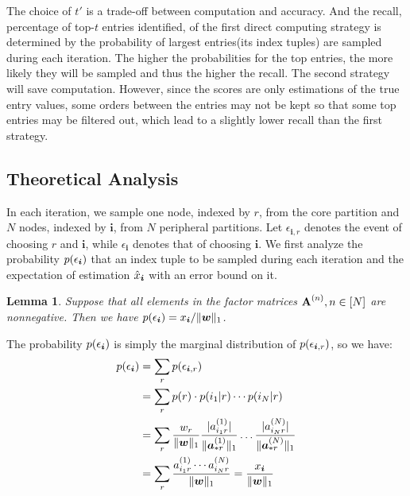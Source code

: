 \documentclass[10pt,journal,compsoc]{IEEEtran}
\newcommand{\Sca}[3]{{#1}^{(#2)}_{i_#2#3}}%
\newcommand{\anr}[2]{\Sca{a}{#1}{#2}}
\newcommand{\V}[1]{{\boldsymbol{{\MakeLowercase{#1}}}}}
\newcommand{\ColVec}[3]{\V{#1}^{(#2)}_{#3}}
\newcommand{\NormColA}[2]{\norm{\ColVec{a}{#1}{*#2}}{1}}
\newcommand{\predx}{\hat{x}_{\V{i}}}
\newcommand{\M}[1]{{\textbf{{\MakeUppercase{#1}}}}}
\newcommand{\norm}[2]{\|#1\|_{#2}}
\newtheorem{lemma}{Lemma}
\begin{document}
The choice of $t'$ is a trade-off between computation and accuracy. And the recall, percentage of top-$t$ entries identified, of the first direct computing strategy is determined by the probability of largest entries(its index tuples) are sampled during each iteration. The higher the probabilities for the top entries, the more likely they will be sampled and thus the higher the recall. The second strategy will save computation. However, since the scores are only estimations of the true entry values, some orders between the entries may not be kept so that some top entries may be filtered out, which lead to a slightly lower recall than the first strategy.


\subsection{Theoretical Analysis}
In each iteration, we sample one node, indexed by $r$, from the core partition and $N$ nodes, indexed by $\boldsymbol{i}$, from $N$ peripheral partitions. Let $\epsilon_{\boldsymbol{i},r}$ denotes the event of choosing $r$ and $\boldsymbol{i}$, while $\epsilon_{\boldsymbol{i}}$ denotes that of choosing $\boldsymbol{i}$. We first analyze the probability $p(\epsilon_{\V{i}})$ that an index tuple to be sampled during each iteration and the expectation of estimation $\predx$ with an error bound on it.

\begin{lemma}\label{lem:CoreBasicProbability}
Suppose that all elements in the factor matrices $\M{A}^{(n)}, n\in[N]$ are nonnegative. Then we have	$p(\epsilon_{\V{i}})=x_{\V{i}}/\norm{\V{w}}{1}$.
\end{lemma}

\begin{IEEEproof}
The probability $p(\epsilon_{\V{i}})$ is simply the marginal distribution of $p(\epsilon_{\V{i},r})$, so we have:
	\begin{align*}
	p(\epsilon_{\V{i}})
	& = \sum_{r} p(\epsilon_{\V{i},r}) \\
	& = \sum_{r} p(r)\cdot p(i_1|r)\cdots p(i_N|r) \\
	& = \sum_{r} \frac{w_{r}}{\norm{\V{W}}{1}}
	\frac{|\anr{1}{r}|}{\NormColA{1}{r}} \ldots \frac{|\anr{N}{r}|}{\NormColA{N}{r}}\\
	& = \sum_{r} \frac{\anr{1}{r}\cdots\anr{N}{r}}{\norm{\V{W}}{1}}
	= \frac{x_{\V{i}}}{\norm{\V{w}}{1}}
	\end{align*}
\end{IEEEproof}
\end{document}
